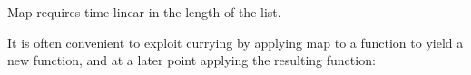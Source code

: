 \begin{fence}
\begin{code}
\AgdaSpace{}%
\AgdaSpace{}%
\AgdaSymbol{(}\AgdaSpace{}%
\AgdaSpace{}%
\AgdaInductiveConstructor{[]}\AgdaSymbol{)}\<%
\\
%
\>[2]\<%
\\
\>[2][@{}l@{\AgdaIndent{0}}]%
\>[4]\AgdaSpace{}%
\AgdaSpace{}%
\AgdaSpace{}%
\AgdaSpace{}%
\AgdaSpace{}%
\AgdaSpace{}%
\AgdaSpace{}%
\AgdaSpace{}%
\AgdaSpace{}%
\AgdaSpace{}%
\AgdaSpace{}%
\AgdaInductiveConstructor{[]}\<%
\\
%
\>[2]\<%
\\
\>[2][@{}l@{\AgdaIndent{0}}]%
\>[4]\AgdaSpace{}%
\AgdaSpace{}%
\AgdaSpace{}%
\AgdaSpace{}%
\AgdaSpace{}%
\AgdaSpace{}%
\AgdaSpace{}%
\AgdaSpace{}%
\AgdaSpace{}%
\AgdaInductiveConstructor{[]}\<%
\\
%
\>[2]\<%
\\
\>[2][@{}l@{\AgdaIndent{0}}]%
\>[4]\AgdaSpace{}%
\AgdaSpace{}%
\AgdaSpace{}%
\AgdaSpace{}%
\AgdaSpace{}%
\AgdaSpace{}%
\AgdaInductiveConstructor{[]}\<%
\\
%
\>[2]\<%
\end{code}
\end{fence}

Map requires time linear in the length of the list.

It is often convenient to exploit currying by applying map to a function
to yield a new function, and at a later point applying the resulting
function:

